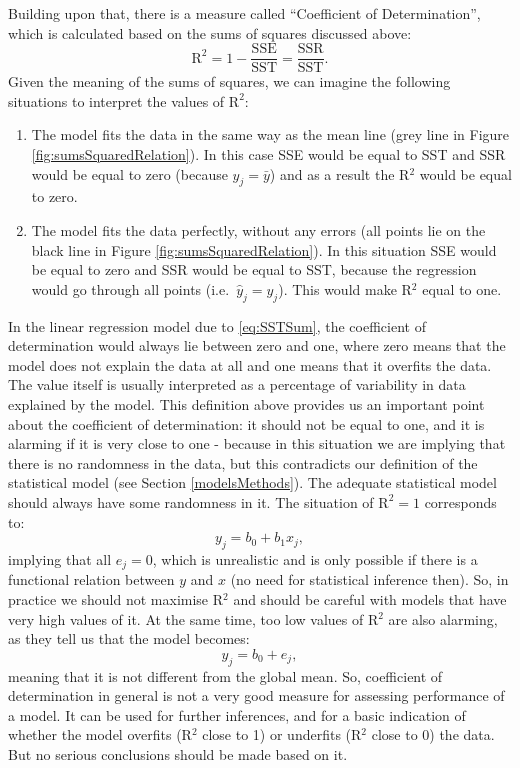 \documentclass[
]{book}
\providecommand{\tightlist}{%
  \setlength{\itemsep}{0pt}\setlength{\parskip}{0pt}}
\theoremstyle{definition}
\theoremstyle{definition}
\theoremstyle{definition}
\theoremstyle{definition}
\theoremstyle{remark}
\begin{document}
Building upon that, there is a measure called ``Coefficient of Determination'', which is calculated based on the sums of squares discussed above:
\begin{equation}
    \mathrm{R}^2 = 1 - \frac{\mathrm{SSE}}{\mathrm{SST}} = \frac{\mathrm{SSR}}{\mathrm{SST}} .
    \label{eq:Determination}
\end{equation}
Given the meaning of the sums of squares, we can imagine the following situations to interpret the values of \(\mathrm{R}^2\):

\begin{enumerate}
\def\labelenumi{\arabic{enumi}.}
\tightlist
\item
  The model fits the data in the same way as the mean line (grey line in Figure \ref{fig:sumsSquaredRelation}). In this case SSE would be equal to SST and SSR would be equal to zero (because \(\hat{y}_j=\bar{y}\)) and as a result the R\(^2\) would be equal to zero.
\item
  The model fits the data perfectly, without any errors (all points lie on the black line in Figure \ref{fig:sumsSquaredRelation}). In this situation SSE would be equal to zero and SSR would be equal to SST, because the regression would go through all points (i.e.~\(\hat{y}_j=y_j\)). This would make R\(^2\) equal to one.
\end{enumerate}

In the linear regression model due to \eqref{eq:SSTSum}, the coefficient of determination would always lie between zero and one, where zero means that the model does not explain the data at all and one means that it overfits the data. The value itself is usually interpreted as a percentage of variability in data explained by the model. This definition above provides us an important point about the coefficient of determination: it should not be equal to one, and it is alarming if it is very close to one - because in this situation we are implying that there is no randomness in the data, but this contradicts our definition of the statistical model (see Section \ref{modelsMethods}). The adequate statistical model should always have some randomness in it. The situation of \(\mathrm{R}^2=1\) corresponds to:
\begin{equation*}
    y_j = b_0 + b_1 x_j ,
\end{equation*}
implying that all \(e_j=0\), which is unrealistic and is only possible if there is a functional relation between \(y\) and \(x\) (no need for statistical inference then). So, in practice we should not maximise R\(^2\) and should be careful with models that have very high values of it. At the same time, too low values of R\(^2\) are also alarming, as they tell us that the model becomes:
\begin{equation*}
    y_j = b_0 + e_j,
\end{equation*}
meaning that it is not different from the global mean. So, coefficient of determination in general is not a very good measure for assessing performance of a model. It can be used for further inferences, and for a basic indication of whether the model overfits (R\(^2\) close to 1) or underfits (R\(^2\) close to 0) the data. But no serious conclusions should be made based on it.
\end{document}
